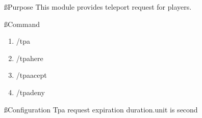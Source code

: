 
\ss{Purpose}
This module provides teleport request for players.

\ss{Command}
\begin{enumerate}
    \item /tpa
    \item /tpahere
    \item /tpaacept
    \item /tpadeny
\end{enumerate}

\ss{Configuration}
Tpa request expiration duration.unit is second

